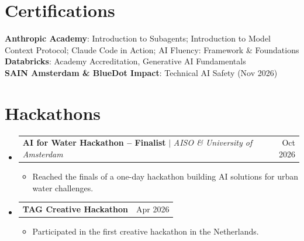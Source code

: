 \documentclass[a4paper,11pt]{article}
\makeatletter
\newcommand{\resumeItem}[1]{\item\small{{#1 \vspace{-2pt}}}}
\newcommand{\resumeProjectHeading}[2]{\item
  \begin{tabular*}{0.97\textwidth}{l@{\extracolsep{\fill}}r}
    \small#1 & #2 \\
  \end{tabular*}\vspace{-7pt}}
\newcommand{\resumeSubHeadingListStart}{\begin{itemize}[leftmargin=0.15in, label={}]}
\newcommand{\resumeSubHeadingListEnd}{\end{itemize}}
\newcommand{\resumeItemListStart}{\begin{itemize}[noitemsep,topsep=1pt]}
\newcommand{\resumeItemListEnd}{\end{itemize}\vspace{-5pt}}
\makeatother
\begin{document}
\section{Certifications}
\begin{itemize}[leftmargin=0.15in, label={}, topsep=2pt]
  \small{\item{
    \textbf{Anthropic Academy}{: Introduction to Subagents; Introduction to Model Context Protocol; Claude Code in Action; AI Fluency: Framework \& Foundations} \\
    \textbf{Databricks}{: Academy Accreditation, Generative AI Fundamentals} \\
    \textbf{SAIN Amsterdam \& BlueDot Impact}{: Technical AI Safety (Nov 2026)}
  }}
\end{itemize}\vspace{-4pt}

\section{Hackathons}
\resumeSubHeadingListStart
  \resumeProjectHeading{\textbf{AI for Water Hackathon -- Finalist} $|$ \emph{AISO \& University of Amsterdam}}{Oct 2026}
  \resumeItemListStart
    \resumeItem{Reached the finals of a one-day hackathon building AI solutions for urban water challenges.}
  \resumeItemListEnd
  \resumeProjectHeading{\textbf{TAG Creative Hackathon}}{Apr 2026}
  \resumeItemListStart
    \resumeItem{Participated in the first creative hackathon in the Netherlands.}
  \resumeItemListEnd
\resumeSubHeadingListEnd
\end{document}
